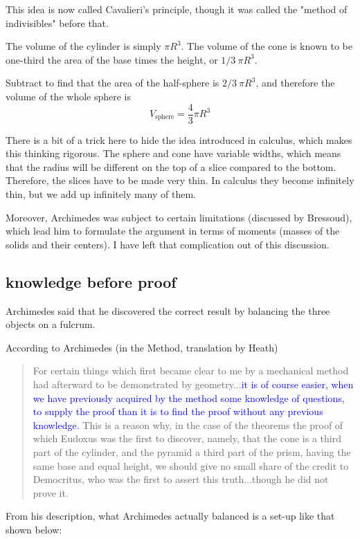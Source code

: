 \documentclass[11pt, oneside]{article}
\begin{document}
This idea is now called Cavalieri's principle, though it was called the "method of indivisibles" before that.

The volume of the cylinder is simply $\pi R^3$.  The volume of the cone is known to be one-third the area of the base times the height, or $1/3 \ \pi R^3$.

Subtract to find that the area of the half-sphere is $2/3 \ \pi R^3$, and therefore the volume of the whole sphere is
\[ V_{\text{sphere}} = \frac{4}{3} \pi R^3 \]

There is a bit of a trick here to hide the idea introduced in calculus, which makes this thinking rigorous.  The sphere and cone have variable widths, which means that the radius will be different on the top of a slice compared to the bottom.  Therefore, the slices have to be made very thin.  In calculus they become infinitely thin, but we add up infinitely many of them.

Moreover, Archimedes was subject to certain limitations (discussed by Bressoud), which lead him to formulate the argument in terms of moments (masses of the solids and their centers).  I have left that complication out of this discussion.

\subsection*{knowledge before proof}

Archimedes said that he discovered the correct result by balancing the three objects on a fulcrum.  

According to Archimedes (in the Method, translation by Heath)

\begin{quote}For certain things which first became clear to me by a mechanical method had afterward to be demonstrated by geometry...\textcolor{blue}{it is of course easier, when we have previously acquired by the method some knowledge of questions, to supply the proof than it is to find the proof without any previous knowledge.} This is a reason why, in the case of the theorems the proof of which Eudoxus was the first to discover, namely, that the cone is a third part of the cylinder, and the pyramid a third part of the prism, having the same base and equal height, we should give no small share of the credit to Democritus, who was the first to assert this truth...though he did not prove it.
\end{quote}

From his description, what Archimedes actually balanced is a set-up like that shown below:
\end{document}
